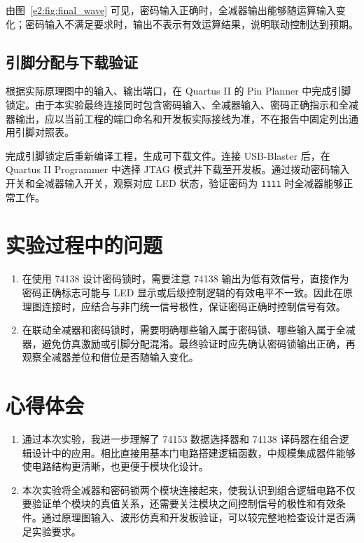 \documentclass{ctexrep}
\begin{document}
由图~\ref{e2:fig:final_wave} 可见，密码输入正确时，全减器输出能够随运算输入变化；密码输入不满足要求时，输出不表示有效运算结果，说明联动控制达到预期。

\subsection{引脚分配与下载验证}

根据实际原理图中的输入、输出端口，在 Quartus II 的 Pin Planner 中完成引脚锁定。由于本实验最终连接同时包含密码输入、全减器输入、密码正确指示和全减器输出，应以当前工程的端口命名和开发板实际接线为准，不在报告中固定列出通用引脚对照表。

完成引脚锁定后重新编译工程，生成可下载文件。连接 USB-Blaster 后，在 Quartus II Programmer 中选择 JTAG 模式并下载至开发板。通过拨动密码输入开关和全减器输入开关，观察对应 LED 状态，验证密码为 \texttt{1111} 时全减器能够正常工作。

\section{实验过程中的问题}

\begin{enumerate}
    \item 在使用 74138 设计密码锁时，需要注意 74138 输出为低有效信号，直接作为密码正确标志可能与 LED 显示或后级控制逻辑的有效电平不一致。因此在原理图连接时，应结合与非门统一信号极性，保证密码正确时控制信号有效。
    \item 在联动全减器和密码锁时，需要明确哪些输入属于密码锁、哪些输入属于全减器，避免仿真激励或引脚分配混淆。最终验证时应先确认密码锁输出正确，再观察全减器差位和借位是否随输入变化。
\end{enumerate}

\section{心得体会}

\begin{enumerate}
    \item 通过本次实验，我进一步理解了 74153 数据选择器和 74138 译码器在组合逻辑设计中的应用。相比直接用基本门电路搭建逻辑函数，中规模集成器件能够使电路结构更清晰，也更便于模块化设计。
    \item 本次实验将全减器和密码锁两个模块连接起来，使我认识到组合逻辑电路不仅要验证单个模块的真值关系，还需要关注模块之间控制信号的极性和有效条件。通过原理图输入、波形仿真和开发板验证，可以较完整地检查设计是否满足实验要求。
\end{enumerate}
\end{document}
